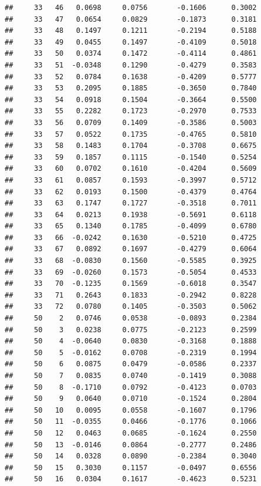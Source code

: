 \documentclass[
]{article}
\begin{document}
\begin{verbatim}
##     33   46   0.0698     0.0756       -0.1606      0.3002  
##     33   47   0.0654     0.0829       -0.1873      0.3181  
##     33   48   0.1497     0.1211       -0.2194      0.5188  
##     33   49   0.0455     0.1497       -0.4109      0.5018  
##     33   50   0.0374     0.1472       -0.4114      0.4861  
##     33   51  -0.0348     0.1290       -0.4279      0.3583  
##     33   52   0.0784     0.1638       -0.4209      0.5777  
##     33   53   0.2095     0.1885       -0.3650      0.7840  
##     33   54   0.0918     0.1504       -0.3664      0.5500  
##     33   55   0.2282     0.1723       -0.2970      0.7533  
##     33   56   0.0709     0.1409       -0.3586      0.5003  
##     33   57   0.0522     0.1735       -0.4765      0.5810  
##     33   58   0.1483     0.1704       -0.3708      0.6675  
##     33   59   0.1857     0.1115       -0.1540      0.5254  
##     33   60   0.0702     0.1610       -0.4204      0.5609  
##     33   61   0.0857     0.1593       -0.3997      0.5712  
##     33   62   0.0193     0.1500       -0.4379      0.4764  
##     33   63   0.1747     0.1727       -0.3518      0.7011  
##     33   64   0.0213     0.1938       -0.5691      0.6118  
##     33   65   0.1340     0.1785       -0.4099      0.6780  
##     33   66  -0.0242     0.1630       -0.5210      0.4725  
##     33   67   0.0892     0.1697       -0.4279      0.6064  
##     33   68  -0.0830     0.1560       -0.5585      0.3925  
##     33   69  -0.0260     0.1573       -0.5054      0.4533  
##     33   70  -0.1235     0.1569       -0.6018      0.3547  
##     33   71   0.2643     0.1833       -0.2942      0.8228  
##     33   72   0.0780     0.1405       -0.3503      0.5062  
##     50    2   0.0746     0.0538       -0.0893      0.2384  
##     50    3   0.0238     0.0775       -0.2123      0.2599  
##     50    4  -0.0640     0.0830       -0.3168      0.1888  
##     50    5  -0.0162     0.0708       -0.2319      0.1994  
##     50    6   0.0875     0.0479       -0.0586      0.2337  
##     50    7   0.0835     0.0740       -0.1419      0.3088  
##     50    8  -0.1710     0.0792       -0.4123      0.0703  
##     50    9   0.0640     0.0710       -0.1524      0.2804  
##     50   10   0.0095     0.0558       -0.1607      0.1796  
##     50   11  -0.0355     0.0466       -0.1776      0.1066  
##     50   12   0.0463     0.0685       -0.1624      0.2550  
##     50   13  -0.0146     0.0864       -0.2777      0.2486  
##     50   14   0.0328     0.0890       -0.2384      0.3040  
##     50   15   0.3030     0.1157       -0.0497      0.6556  
##     50   16   0.0304     0.1617       -0.4623      0.5231  

\end{verbatim}
\end{document}
